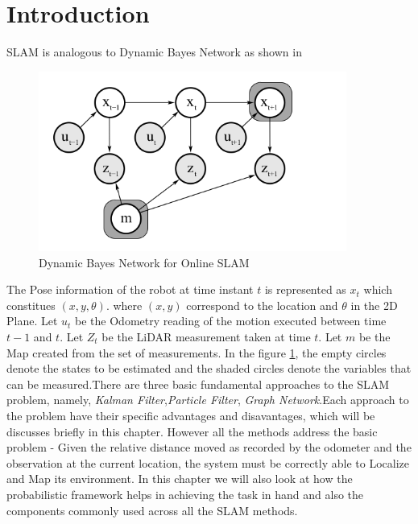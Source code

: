 \section{Introduction}
    SLAM is analogous to Dynamic Bayes Network as shown in 
    \begin{figure}[h] \label{fig:DBNOn}
        \includegraphics[width=0.9\textwidth]{images/DBN_Online.png}
        \caption{Dynamic Bayes Network for Online SLAM}
    \end{figure}
        The Pose information of the robot at time instant $t$ is represented as $x_t$ which constitues $(x,y,\theta)$.
where $(x,y)$ correspond to the location and $\theta$  in the 2D Plane. Let $u_t$ be the Odometry reading of the motion executed between time $t-1$ and $t$. Let $Z_t$ be the LiDAR measurement
taken at time $t$. Let $m$ be the Map created from the set of measurements. In the figure \ref{fig:DBNOn}, the empty circles denote the states to be estimated and the shaded circles denote the variables that can be 
measured.There are three basic fundamental approaches to the SLAM problem, namely, \textit{Kalman Filter},\textit{Particle Filter},
\textit{Graph Network}.Each approach to the problem have their specific advantages and disavantages, which will be discusses briefly in this chapter. However all the methods address the basic problem -
Given the relative distance moved as recorded by the odometer and the observation at the current location, the system must be correctly able to Localize and Map its environment. 
In this chapter we will also look at how the probabilistic framework helps in achieving the task in hand and also the components commonly used across all the SLAM methods.
